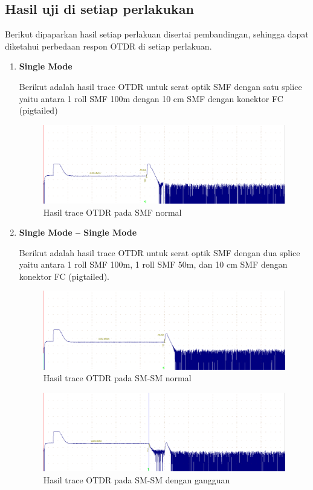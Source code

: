 \documentclass[12pt]{article}
\begin{document}
	\subsection{Hasil uji di setiap perlakukan }
	
	Berikut dipaparkan hasil setiap perlakuan disertai pembandingan, sehingga dapat diketahui perbedaan respon OTDR di setiap perlakuan.
	
	\begin{enumerate}
		\item \textbf{Single Mode}

		Berikut adalah hasil trace OTDR untuk serat optik SMF dengan satu splice yaitu antara 1 roll SMF 100m dengan 10 cm SMF dengan konektor FC (pigtailed)
		
		\begin{figure}[h!]
			\centering
			\captionsetup{justification=centering}
			\includegraphics[width=0.5\linewidth]{images/Bab_4/Bab_4_3a1}
			\caption[Trace SMF]{\small{Hasil trace OTDR pada SMF normal}}
		\end{figure}
		
		\item \textbf{Single Mode – Single Mode}
		
		Berikut adalah hasil trace OTDR untuk serat optik SMF dengan dua splice yaitu antara 1 roll SMF 100m, 1 roll SMF 50m, dan 10 cm SMF dengan konektor FC (pigtailed).
		
		\begin{figure}[h!]
			\centering
			\captionsetup{justification=centering}
			\includegraphics[width=0.5\linewidth]{images/Bab_4/Bab_4_3b1}
			\caption[Trace SMF-SMF]{\small{Hasil trace OTDR pada SM-SM normal}}
		\end{figure}
		
		\begin{figure}[h!]
			\centering
			\captionsetup{justification=centering}
			\includegraphics[width=0.5\linewidth]{images/Bab_4/Bab_4_3b2}
			\caption[Trace SMF-SMF]{\small{Hasil trace OTDR pada SM-SM dengan gangguan}}
		\end{figure}
		

\end{enumerate}
\end{document}
